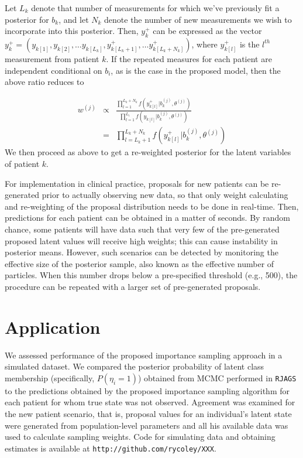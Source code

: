 \documentclass[letterpaper]{article}
\begin{document}
Let $L_{k}$ denote that number of measurements for which we've previously fit a posterior for $b_{k}$, and let $N_{k}$ denote the number of new measurements we wish to incorporate into this posterior. Then, $y_{k}^{+}$ can be expressed as the vector $y_{k}^{+}=(y_{k[1]},y_{k[2]},\dots y_{k[L_{k}]},y_{k[L_{k}+1]}^{+},\dots y_{k[L_{k}+N_{k}]}^{+})$, where $y_{k[l]}^{+}$ is the $l^{th}$ measurement from patient $k$. If the repeated measures for each patient are independent conditional on $b_{i}$, as is the case in the proposed model, then the above ratio reduces to

\begin{eqnarray*}
w^{(j)} & \propto & \frac{\prod_{l=1}^{L_{k}+N_{k}}f(\ensuremath{ y_{k[l]}^{+}} |b_{k}^{(j)},\theta^{(j)})}{\prod_{l=1}^{L_{i}}f(\ensuremath{y_{k[l]}} |b_{ k}^{(j)},\theta^{(j)})}\\
 & = & \prod_{l=L_{k}+1}^{L_{k}+N_{k}}f(\ensuremath{y_{k[l]}^{+}}|b_{k}^{(j)},\theta^{(j)})
\end{eqnarray*}
We then proceed as above to get a re-weighted posterior for the latent variables of patient $k$. 

For implementation in clinical practice, proposals for new patients can be re-generated prior to actually observing new data, so that only weight calculating and re-weighting of the proposal distribution needs to be done in real-time. Then, predictions for each patient can be obtained in a matter of seconds. By random chance, some patients will have data such that very few of the pre-generated proposed latent values will receive high weights; this can cause instability in posterior means. However, such scenarios can be detected by monitoring the effective size of the posterior sample, also known as the effective number of particles. When this number drops below a pre-specified threshold (e.g., 500), the procedure can be repeated with a larger set of pre-generated proposals. 



\section{Application}
We assessed performance of the proposed importance sampling approach in a simulated dataset. We compared the posterior probability of latent class membership (specifically, $P(\eta_i=1)$) obtained from MCMC performed in \texttt{RJAGS} to the predictions obtained by the proposed importance sampling algorithm for each patient for whom true state was not observed. Agreement was examined for the new patient scenario, that is, proposal values for an individual's latent state were generated from population-level parameters and all his available data was used to calculate sampling weights. Code for simulating data and obtaining estimates is available at \texttt{http://github.com/rycoley/XXX}.
\end{document}

